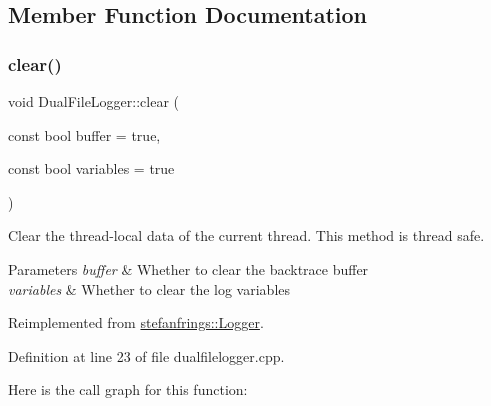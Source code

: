 \subsection{Member Function Documentation}
\mbox{\label{classstefanfrings_1_1_dual_file_logger_a4af0d2c35121b1f40dbd08b053a53ddf}} 
\subsubsection{\texorpdfstring{clear()}{clear()}}
{\footnotesize\ttfamily void Dual\+File\+Logger\+::clear (\begin{DoxyParamCaption}\item[{const bool}]{buffer = {\ttfamily true},  }\item[{const bool}]{variables = {\ttfamily true} }\end{DoxyParamCaption})\hspace{0.3cm}{\ttfamily [virtual]}}

Clear the thread-\/local data of the current thread. This method is thread safe. 
\begin{DoxyParams}{Parameters}
{\em buffer} & Whether to clear the backtrace buffer \\
\hline
{\em variables} & Whether to clear the log variables \\
\hline
\end{DoxyParams}


Reimplemented from \mbox{\hyperlink{classstefanfrings_1_1_logger_a4dc933a2f38098fc539f7e17fc39da41}{stefanfrings\+::\+Logger}}.



Definition at line 23 of file dualfilelogger.\+cpp.

Here is the call graph for this function\+:
\mbox{\label{classstefanfrings_1_1_dual_file_logger_a6db25d5c835b7221f0a6b7b4a035d4aa}} 
